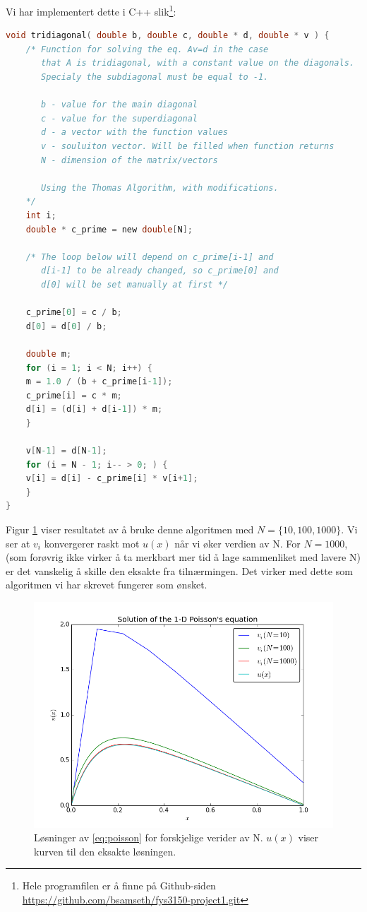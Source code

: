 \documentclass[11pt]{article}
\begin{document}
Vi har implementert dette i C++ slik\footnote{Hele programfilen er å
  finne på Github-siden \url{https://github.com/bsamseth/fys3150-project1.git}}:
\begin{lstlisting}[language=C]
void tridiagonal( double b, double c, double * d, double * v ) {
    /* Function for solving the eq. Av=d in the case 
       that A is tridiagonal, with a constant value on the diagonals.
       Specialy the subdiagonal must be equal to -1.

       b - value for the main diagonal
       c - value for the superdiagonal
       d - a vector with the function values
       v - souluiton vector. Will be filled when function returns
       N - dimension of the matrix/vectors

       Using the Thomas Algorithm, with modifications.
    */
    int i;
    double * c_prime = new double[N];

    /* The loop below will depend on c_prime[i-1] and 
       d[i-1] to be already changed, so c_prime[0] and 
       d[0] will be set manually at first */
    
    c_prime[0] = c / b;
    d[0] = d[0] / b;

    double m;
    for (i = 1; i < N; i++) {
	m = 1.0 / (b + c_prime[i-1]);
	c_prime[i] = c * m;
	d[i] = (d[i] + d[i-1]) * m;
    }

    v[N-1] = d[N-1];
    for (i = N - 1; i-- > 0; ) {
	v[i] = d[i] - c_prime[i] * v[i+1];
    }
}
\end{lstlisting}

Figur \ref{fig:b} viser resultatet av å bruke denne algoritmen med
$N = \{10,100,1000\}$. Vi ser at $v_i$ konvergerer raskt mot $u(x)$
når vi øker verdien av N. For $N=1000$, (som forøvrig ikke virker å ta
merkbart mer tid å lage sammenliket med lavere N) er det vanskelig å
skille den eksakte fra tilnærmingen. Det virker med dette som
algoritmen vi har skrevet fungerer som ønsket.

\begin{figure}[ht]
  \centering
  \includegraphics[scale=0.7]{fig/b.png}
  \caption{\label{fig:b} Løsninger av \eqref{eq:poisson} for
    forskjelige verider av N. $u(x)$ viser kurven til den eksakte løsningen.}
\end{figure}
\end{document}
